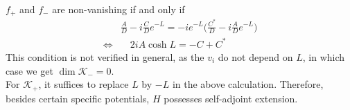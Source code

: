 $f_+$ and $f_-$ are non-vanishing if and only if 
\begin{equation}
\begin{split}
& \frac A D - i\frac C D e^{-L} =  -ie^{-L}\big(\frac{ C^*}{ D} -i \frac A D e^{-L}\big) \\
\Leftrightarrow & \quad 2i A \cosh L = -C + C^*
\end{split}
\end{equation}
This condition is not verified in general, as the $v_i$ do not depend on $L$, in which case we get $\dim \mathcal{K}_- = 0$. \\
For $\mathcal{K}_+$, it suffices to replace $L$ by $-L$ in the above calculation. Therefore, besides certain specific potentials, $H$ possesses self-adjoint extension.

















